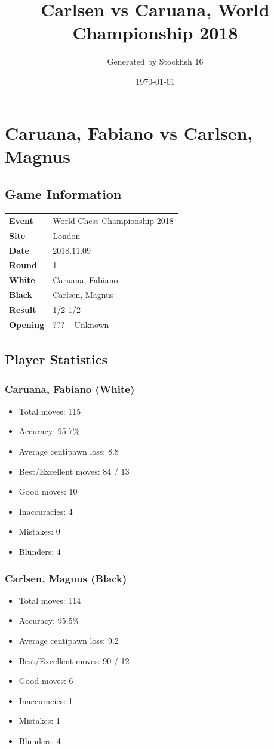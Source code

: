 \documentclass[11pt]{book}
\title{Carlsen vs Caruana, World Championship 2018}
\author{Generated by Stockfish 16}
\date{\today}
\begin{document}
\maketitle
\tableofcontents

\chapter{Caruana, Fabiano vs Carlsen, Magnus}

\section{Game Information}
\begin{tabular}{ll}
\textbf{Event} & World Chess Championship 2018 \\
\textbf{Site} & London \\
\textbf{Date} & 2018.11.09 \\
\textbf{Round} & 1 \\
\textbf{White} & Caruana, Fabiano \\
\textbf{Black} & Carlsen, Magnus \\
\textbf{Result} & 1/2-1/2 \\
\textbf{Opening} & ??? -- Unknown \\
\end{tabular}

\section{Player Statistics}

\subsection{Caruana, Fabiano (White)}
\begin{itemize}
\item Total moves: 115
\item Accuracy: 95.7\%
\item Average centipawn loss: 8.8
\item Best/Excellent moves: 84 / 13
\item Good moves: 10
\item Inaccuracies: 4
\item Mistakes: 0
\item Blunders: 4
\end{itemize}

\subsection{Carlsen, Magnus (Black)}
\begin{itemize}
\item Total moves: 114
\item Accuracy: 95.5\%
\item Average centipawn loss: 9.2
\item Best/Excellent moves: 90 / 12
\item Good moves: 6
\item Inaccuracies: 1
\item Mistakes: 1
\item Blunders: 4
\end{itemize}
\end{document}
